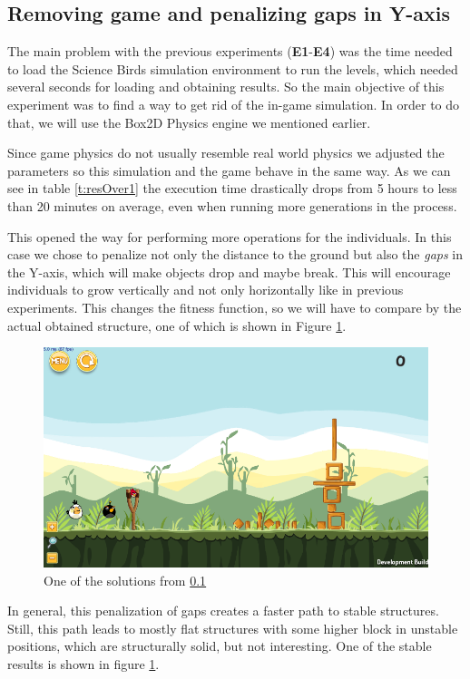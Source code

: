 \documentclass[a4paper,twoside]{article}
\begin{document}
\subsection{Removing game and penalizing gaps in Y-axis}\label{E5}

The main problem with the previous experiments (\textbf{E1}-\textbf{E4}) was the time needed to load the Science Birds simulation environment to run the levels, which needed several seconds for loading and obtaining results. So the main objective of this experiment was to find a way to get rid of the in-game simulation. In order to do that, we will use the Box2D \cite{catto2011box2d} Physics engine we mentioned earlier.

Since game physics do not usually resemble real world physics we adjusted
the parameters so this simulation and the game behave in the same way.
As we can see in table \ref{t:resOver1} the execution time drastically
drops from 5 hours to less than 20 minutes on average, even when running
more generations in the process.


This opened the way for performing more 
operations for the individuals. In this case we chose to penalize
not only the distance to the ground but also the \textit{gaps} in the
Y-axis, which will make objects drop and maybe break.
This will encourage individuals to grow vertically and not only horizontally
like in previous experiments. This changes the fitness function, so we
will have to compare by the actual obtained structure, one of which is
shown in Figure \ref{f:e5}.
%
 \begin{figure}
 	\centering
 	\includegraphics[scale=0.3]{E5.png}
 	\caption{One of the solutions from \ref{E5}}\label{f:e5}
      \end{figure}

In general, this penalization of gaps creates a faster path to stable
structures. Still, this path leads to mostly flat structures with 
some higher block in unstable positions, which
are structurally solid, but not interesting. One of the stable results is shown in figure \ref{f:e5}.
\end{document}
